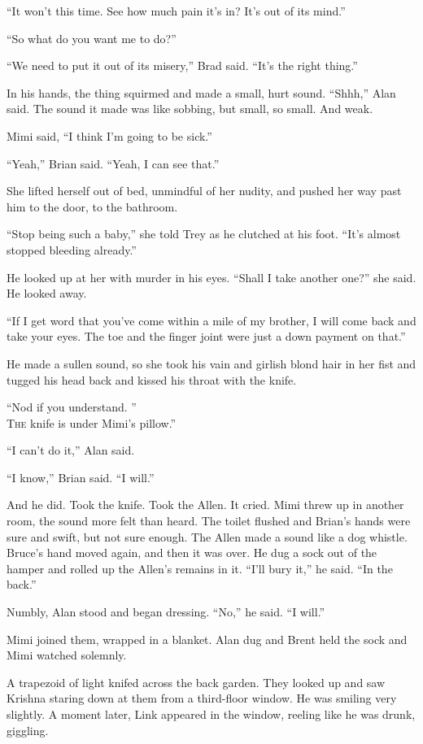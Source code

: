 \documentclass{article}
\begin{document}
``It won't this time.  See how much pain it's in?  It's out of its
mind.''

``So what do you want me to do?''

``We need to put it out of its misery,'' Brad said.  ``It's the right
thing.''

In his hands, the thing squirmed and made a small, hurt sound. 
``Shhh,'' Alan said.  The sound it made was like sobbing, but small,
so small.  And weak.

Mimi said, ``I think I'm going to be sick.''

``Yeah,'' Brian said.  ``Yeah, I can see that.''

She lifted herself out of bed, unmindful of her nudity, and pushed her
way past him to the door, to the bathroom.

``Stop being such a baby,'' she told Trey as he clutched at his foot. 
``It's almost stopped bleeding already.''

He looked up at her with murder in his eyes.  ``Shall I take another
one?'' she said.  He looked away.

``If I get word that you've come within a mile of my brother, I will
come back and take your eyes.  The toe and the finger joint were just
a down payment on that.''

He made a sullen sound, so she took his vain and girlish blond hair in
her fist and tugged his head back and kissed his throat with the
knife.

``Nod if you understand.  ''
\\
\lettrine[lines=3, lhang=.5, nindent=0pt, findent=2pt]{T}{he}
knife is under Mimi's pillow.''

``I can't do it,'' Alan said. 

``I know,'' Brian said.  ``I will.''

And he did.  Took the knife.  Took the Allen.  It cried.  Mimi threw
up in another room, the sound more felt than heard.  The toilet
flushed and Brian's hands were sure and swift, but not sure enough. 
The Allen made a sound like a dog whistle.  Bruce's hand moved again,
and then it was over.  He dug a sock out of the hamper and rolled up
the Allen's remains in it.  ``I'll bury it,'' he said.  ``In the
back.''

Numbly, Alan stood and began dressing.  ``No,'' he said.  ``I will.''

Mimi joined them, wrapped in a blanket.  Alan dug and Brent held the
sock and Mimi watched solemnly. 

A trapezoid of light knifed across the back garden.  They looked up
and saw Krishna staring down at them from a third-floor window.  He
was smiling very slightly.  A moment later, Link appeared in the
window, reeling like he was drunk, giggling.
\end{document}
